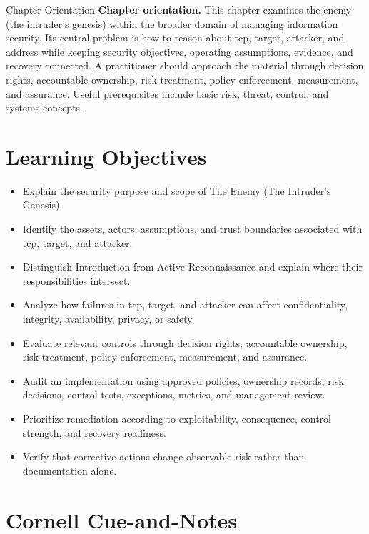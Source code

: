 \documentclass[11pt,letterpaper]{article}
\title{\CornellDocumentTitle}
\author{}
\date{}
\begin{document}
\maketitle
\begin{CornellOverviewBox}{Chapter Orientation}
\textbf{Chapter orientation.} This chapter examines the enemy (the intruder's genesis) within the broader domain of managing information security. Its central problem is how to reason about tcp, target, attacker, and address while keeping security objectives, operating assumptions, evidence, and recovery connected. A practitioner should approach the material through decision rights, accountable ownership, risk treatment, policy enforcement, measurement, and assurance. Useful prerequisites include basic risk, threat, control, and systems concepts.
\end{CornellOverviewBox}
\section*{Learning Objectives}
\begin{itemize}
\item Explain the security purpose and scope of The Enemy (The Intruder's Genesis).
\item Identify the assets, actors, assumptions, and trust boundaries associated with tcp, target, and attacker.
\item Distinguish Introduction from Active Reconnaissance and explain where their responsibilities intersect.
\item Analyze how failures in tcp, target, and attacker can affect confidentiality, integrity, availability, privacy, or safety.
\item Evaluate relevant controls through decision rights, accountable ownership, risk treatment, policy enforcement, measurement, and assurance.
\item Audit an implementation using approved policies, ownership records, risk decisions, control tests, exceptions, metrics, and management review.
\item Prioritize remediation according to exploitability, consequence, control strength, and recovery readiness.
\item Verify that corrective actions change observable risk rather than documentation alone.
\end{itemize}
\section*{Cornell Cue-and-Notes}
\end{document}
